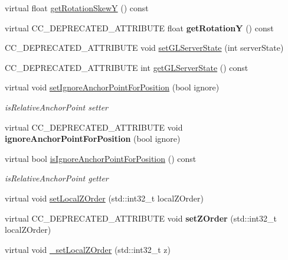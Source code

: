 \begin{Indent}
\begin{DoxyCompactItemize}
\item 
virtual float \hyperlink{classNode_a6cad8b8118f9530baa3f26659cc1f406}{get\+Rotation\+SkewY} () const
\item 
\mbox{\label{classNode_aee61900edf93cad256bd250f69e02065}} 
virtual C\+C\+\_\+\+D\+E\+P\+R\+E\+C\+A\+T\+E\+D\+\_\+\+A\+T\+T\+R\+I\+B\+U\+TE float {\bfseries get\+RotationY} () const
\item 
C\+C\+\_\+\+D\+E\+P\+R\+E\+C\+A\+T\+E\+D\+\_\+\+A\+T\+T\+R\+I\+B\+U\+TE void \hyperlink{classNode_ad218be5dafbfc529444c1e619841260e}{set\+G\+L\+Server\+State} (int server\+State)
\item 
C\+C\+\_\+\+D\+E\+P\+R\+E\+C\+A\+T\+E\+D\+\_\+\+A\+T\+T\+R\+I\+B\+U\+TE int \hyperlink{classNode_a4817ce95fa64827e8a58645e5b5854ae}{get\+G\+L\+Server\+State} () const
\item 
virtual void \hyperlink{classNode_a75e8f6a6a46358d6faf8683e720d47b5}{set\+Ignore\+Anchor\+Point\+For\+Position} (bool ignore)
\begin{DoxyCompactList}\small\item\em is\+Relative\+Anchor\+Point setter \end{DoxyCompactList}\item 
\mbox{\label{classNode_af57b28e27b22e7473e902771db3581e4}} 
virtual C\+C\+\_\+\+D\+E\+P\+R\+E\+C\+A\+T\+E\+D\+\_\+\+A\+T\+T\+R\+I\+B\+U\+TE void {\bfseries ignore\+Anchor\+Point\+For\+Position} (bool ignore)
\item 
virtual bool \hyperlink{classNode_a1997a39d72ed74207a8ff7b5fe921be9}{is\+Ignore\+Anchor\+Point\+For\+Position} () const
\begin{DoxyCompactList}\small\item\em is\+Relative\+Anchor\+Point getter \end{DoxyCompactList}\item 
virtual void \hyperlink{classNode_a3a240c11ff1bbc265e46bbc2e1d34179}{set\+Local\+Z\+Order} (std\+::int32\+\_\+t local\+Z\+Order)
\item 
\mbox{\label{classNode_adc612dbd8cd0226aaaff754b4162984b}} 
virtual C\+C\+\_\+\+D\+E\+P\+R\+E\+C\+A\+T\+E\+D\+\_\+\+A\+T\+T\+R\+I\+B\+U\+TE void {\bfseries set\+Z\+Order} (std\+::int32\+\_\+t local\+Z\+Order)
\item 
virtual void \hyperlink{classNode_ae0ab4e6bbde6dad91266f8fde8e25b77}{\+\_\+set\+Local\+Z\+Order} (std\+::int32\+\_\+t z)

\end{DoxyCompactItemize}
\end{Indent}
